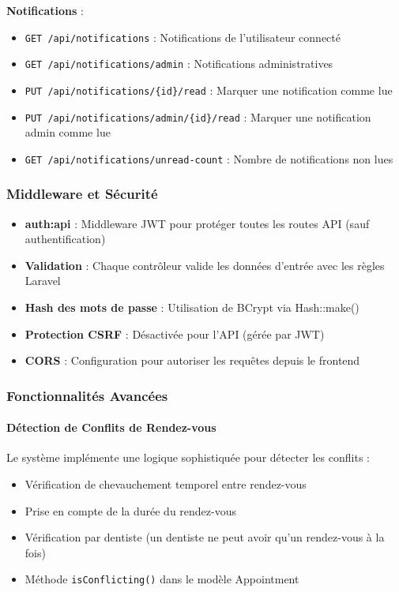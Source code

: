 \documentclass[12pt,a4paper]{report}
\begin{document}
\textbf{Notifications} :
\begin{itemize}
    \item \texttt{GET /api/notifications} : Notifications de l'utilisateur connecté
    \item \texttt{GET /api/notifications/admin} : Notifications administratives
    \item \texttt{PUT /api/notifications/\{id\}/read} : Marquer une notification comme lue
    \item \texttt{PUT /api/notifications/admin/\{id\}/read} : Marquer une notification admin comme lue
    \item \texttt{GET /api/notifications/unread-count} : Nombre de notifications non lues
\end{itemize}

\subsubsection{Middleware et Sécurité}

\begin{itemize}
    \item \textbf{auth:api} : Middleware JWT pour protéger toutes les routes API (sauf authentification)
    \item \textbf{Validation} : Chaque contrôleur valide les données d'entrée avec les règles Laravel
    \item \textbf{Hash des mots de passe} : Utilisation de BCrypt via Hash::make()
    \item \textbf{Protection CSRF} : Désactivée pour l'API (gérée par JWT)
    \item \textbf{CORS} : Configuration pour autoriser les requêtes depuis le frontend
\end{itemize}

\subsubsection{Fonctionnalités Avancées}

\paragraph{Détection de Conflits de Rendez-vous}

Le système implémente une logique sophistiquée pour détecter les conflits :
\begin{itemize}
    \item Vérification de chevauchement temporel entre rendez-vous
    \item Prise en compte de la durée du rendez-vous
    \item Vérification par dentiste (un dentiste ne peut avoir qu'un rendez-vous à la fois)
    \item Méthode \texttt{isConflicting()} dans le modèle Appointment
\end{itemize}
\end{document}
